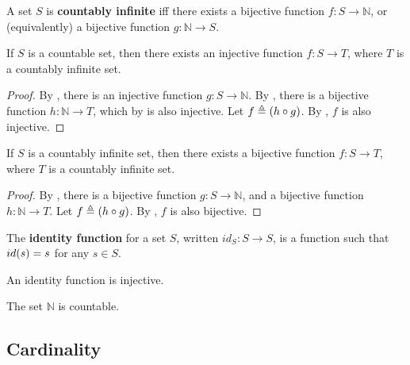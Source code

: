 \begin{definition} \label{def:countably-infinite} A set $S$ is
\textbf{countably infinite} iff there exists a bijective function $f : S
\rightarrow \mathbb{N}$, or (equivalently) a bijective function $g : \mathbb{N}
\rightarrow S$. \end{definition}

\begin{theorem} \label{thm:countable-to-countably-infinite} If $S$ is a
countable set, then there exists an injective function $f : S \rightarrow T$,
where $T$ is a countably infinite set.  \end{theorem}

\begin{proof} By , there is an injective function $g : S
\rightarrow \mathbb{N}$. By , there is a bijective
function $h : \mathbb{N} \rightarrow T$, which by  is also
injective. Let $f \triangleq \mathopen{}\left({h \circ g}\right)\mathclose{}$. By , $f$
is also injective. \end{proof}

\begin{theorem} \label{thm:countably-infinite-to-countably-infinite} If $S$ is
a countably infinite set, then there exists a bijective function $f : S
\rightarrow T$, where $T$ is a countably infinite set. \end{theorem}

\begin{proof} By , there is a bijective function $g
: S \rightarrow \mathbb{N}$, and a bijective function $h : \mathbb{N}
\rightarrow T$. Let $f \triangleq \mathopen{}\left({h \circ g}\right)\mathclose{}$. By
, $f$ is also bijective.\end{proof}

\begin{definition} \label{def:id-function} The \textbf{identity function} for a
set $S$, written $id_S : S\rightarrow S$, is a function such that $id\mathopen{}\left({s}\right)\mathclose{}=s$
for any $s\in S$. \end{definition}

\begin{corollary} An identity function is injective. \end{corollary}

\begin{corollary} The set $\mathbb{N}$ is countable. \end{corollary}

\subsection{Cardinality}

